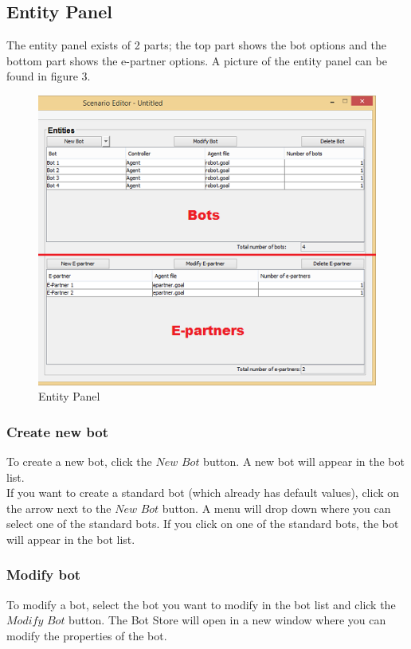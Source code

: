 \subsection{Entity Panel}
The entity panel exists of 2 parts; the top part shows the bot options and the bottom part shows the e-partner options. A picture of the entity panel can be found in figure 3.
\begin{figure}[h]
\begin{center}
\includegraphics{ScenarioEditor/bot.png}
\end{center}
\caption{Entity Panel}
\end{figure}
\subsubsection{Create new bot}
To create a new bot, click the $New$ $Bot$ button. A new bot will appear in the bot list.\\
If you want to create a standard bot (which already has default values), click on the arrow next to the $New$ $Bot$ button. A menu will drop down where you can select one of the standard bots. If you click on one of the standard bots, the bot will appear in the bot list.

\subsubsection{Modify bot}
To modify a bot, select the bot you want to modify in the bot list and click the $Modify$ $Bot$ button. The Bot Store will open in a new window where you can modify the properties of the bot.

